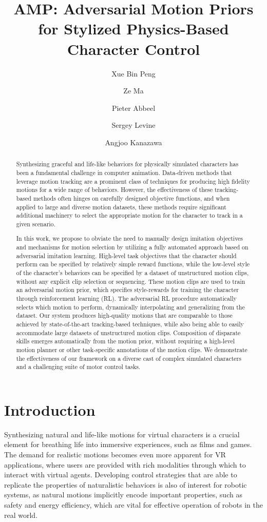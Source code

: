 \documentclass[acmtog]{acmart}
\title{AMP: Adversarial Motion Priors for Stylized Physics-Based Character Control}
\author{Xue Bin Peng}
\affiliation{%
  \institution{University of California, Berkeley}
  \country{USA}
}
\author{Ze Ma}
\affiliation{%
  \institution{Shanghai Jiao Tong University}
  \country{China}
}
\author{Pieter Abbeel}
\affiliation{%
  \institution{University of California, Berkeley}
  \country{USA}
}
\author{Sergey Levine}
\affiliation{%
  \institution{University of California, Berkeley}
  \country{USA}
}
\author{Angjoo Kanazawa}
\affiliation{%
  \institution{University of California, Berkeley}
  \country{USA}
}
\begin{document}
\begin{abstract}
Synthesizing graceful and life-like behaviors for physically simulated characters has been a fundamental challenge in computer animation. Data-driven methods that leverage motion tracking are a prominent class of techniques for producing high fidelity motions for a wide range of behaviors. However, the effectiveness of these tracking-based methods often hinges on carefully designed objective functions, and when applied to large and diverse motion datasets, these methods require significant additional machinery to select the appropriate motion for the character to track in a given scenario. 

In this work, we propose to obviate the need to manually design imitation objectives and mechanisms for motion selection by utilizing a fully automated approach based on adversarial imitation learning. High-level task objectives that the character should perform can be specified by relatively simple reward functions, while the low-level style of the character's behaviors can be specified by a dataset of unstructured motion clips, without any explicit clip selection or sequencing. These motion clips are used to train an adversarial motion prior, which specifies style-rewards for training the character through reinforcement learning (RL). The adversarial RL procedure automatically selects which motion to perform, dynamically interpolating and generalizing from the dataset. Our system produces high-quality motions that are comparable to those achieved by state-of-the-art tracking-based techniques, while also being able to easily accommodate large datasets of unstructured motion clips. Composition of disparate skills emerges automatically from the motion prior, without requiring a high-level motion planner or other task-specific annotations of the motion clips. We demonstrate the effectiveness of our framework on a diverse cast of complex simulated characters and a challenging suite of motor control tasks.
\end{abstract}

\maketitle

\section{Introduction}
Synthesizing natural and life-like motions for virtual characters is a crucial element for breathing life into immersive experiences, such as films and games. The demand for realistic motions becomes even more apparent for VR applications, where users are provided with rich modalities through which to interact with virtual agents. Developing control strategies that are able to replicate the properties of naturalistic behaviors is also of interest for robotic systems, as natural motions implicitly encode important properties, such as safety and energy efficiency, which are vital for effective operation of robots in the real world.
\end{document}
